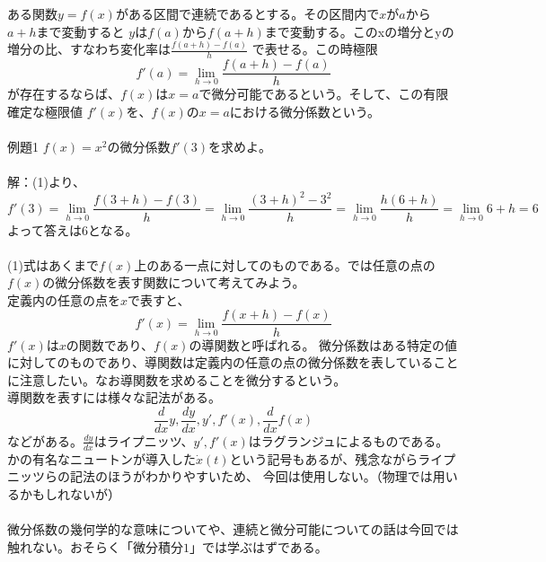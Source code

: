 \documentclass[a4j,dvipdfmx]{jsarticle}
\begin{document}
    ある関数$y=f(x)$がある区間で連続であるとする。その区間内で$x$が$a$から$a+h$まで変動すると
    $y$は$f(a)$から$f(a+h)$まで変動する。このxの増分とyの増分の比、すなわち変化率は$\frac{f(a+h)-f(a)}{h}$
    で表せる。この時極限\\
    \begin{equation}
        f'(a)=\lim_{h\rightarrow0}\frac{f(a+h)-f(a)}{h}
    \end{equation}
    が存在するならば、$f(x)$は$x=a$で微分可能であるという。そして、この有限確定な極限値
    $f'(x)$を、$f(x)$の$x=a$における微分係数という。\\\\
    例題1 $f(x)=x^2$の微分係数$f'(3)$を求めよ。\\\\
    解：(1)より、\\
    \begin{equation*}
        f'(3)=\lim_{h\rightarrow0}\frac{f(3+h)-f(3)}{h}=\lim_{h\rightarrow0}\frac{(3+h)^2-3^2}{h}
        =\lim_{h\rightarrow0}\frac{h(6+h)}{h}=\lim_{h\rightarrow0}6+h=6
    \end{equation*} 
    よって答えは6となる。\\\\
    (1)式はあくまで$f(x)$上のある一点に対してのものである。では任意の点の$f(x)$の微分係数を表す関数について考えてみよう。\\
    定義内の任意の点を$x$で表すと、\\
    \begin{equation}
        f'(x)=\lim_{h\rightarrow0}\frac{f(x+h)-f(x)}{h}
    \end{equation}
    $f'(x)$は$x$の関数であり、$f(x)$の導関数と呼ばれる。
    微分係数はある特定の値に対してのものであり、導関数は定義内の任意の点の微分係数を表していることに注意したい。なお導関数を求めることを微分するという。\\
    導関数を表すには様々な記法がある。\\
    \begin{equation*}
        \frac{d}{dx}y,\frac{dy}{dx},y',f'(x),\frac{d}{dx}f(x)
    \end{equation*}
    などがある。$\frac{dy}{dx}$はライプニッツ、$y',f'(x)$はラグランジュによるものである。\\
    かの有名なニュートンが導入した$\dot{x}(t)$という記号もあるが、残念ながらライプニッツらの記法のほうがわかりやすいため、
    今回は使用しない。（物理では用いるかもしれないが）\\\\
    微分係数の幾何学的な意味についてや、連続と微分可能についての話は今回では触れない。おそらく「微分積分$1$」では学ぶはずである。\\\\
\end{document}
